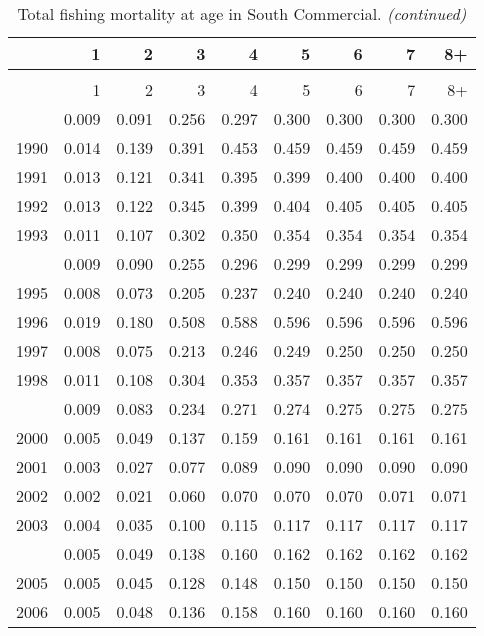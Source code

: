 \documentclass[
]{article}
\begin{document}
\begin{longtable}[t]{lrrrrrrrr}
\caption{\label{tab:South_Commercial-fleet-FAA-table}Total fishing mortality at age in South Commercial.}\\
\toprule
  & 1 & 2 & 3 & 4 & 5 & 6 & 7 & 8+\\
\midrule
\endfirsthead
\caption[]{Total fishing mortality at age in South Commercial. \textit{(continued)}}\\
\toprule
  & 1 & 2 & 3 & 4 & 5 & 6 & 7 & 8+\\
\midrule
\endhead

\endfoot
\bottomrule
\endlastfoot
1989 & 0.009 & 0.091 & 0.256 & 0.297 & 0.300 & 0.300 & 0.300 & 0.300\\
1990 & 0.014 & 0.139 & 0.391 & 0.453 & 0.459 & 0.459 & 0.459 & 0.459\\
1991 & 0.013 & 0.121 & 0.341 & 0.395 & 0.399 & 0.400 & 0.400 & 0.400\\
1992 & 0.013 & 0.122 & 0.345 & 0.399 & 0.404 & 0.405 & 0.405 & 0.405\\
1993 & 0.011 & 0.107 & 0.302 & 0.350 & 0.354 & 0.354 & 0.354 & 0.354\\
\addlinespace
1994 & 0.009 & 0.090 & 0.255 & 0.296 & 0.299 & 0.299 & 0.299 & 0.299\\
1995 & 0.008 & 0.073 & 0.205 & 0.237 & 0.240 & 0.240 & 0.240 & 0.240\\
1996 & 0.019 & 0.180 & 0.508 & 0.588 & 0.596 & 0.596 & 0.596 & 0.596\\
1997 & 0.008 & 0.075 & 0.213 & 0.246 & 0.249 & 0.250 & 0.250 & 0.250\\
1998 & 0.011 & 0.108 & 0.304 & 0.353 & 0.357 & 0.357 & 0.357 & 0.357\\
\addlinespace
1999 & 0.009 & 0.083 & 0.234 & 0.271 & 0.274 & 0.275 & 0.275 & 0.275\\
2000 & 0.005 & 0.049 & 0.137 & 0.159 & 0.161 & 0.161 & 0.161 & 0.161\\
2001 & 0.003 & 0.027 & 0.077 & 0.089 & 0.090 & 0.090 & 0.090 & 0.090\\
2002 & 0.002 & 0.021 & 0.060 & 0.070 & 0.070 & 0.070 & 0.071 & 0.071\\
2003 & 0.004 & 0.035 & 0.100 & 0.115 & 0.117 & 0.117 & 0.117 & 0.117\\
\addlinespace
2004 & 0.005 & 0.049 & 0.138 & 0.160 & 0.162 & 0.162 & 0.162 & 0.162\\
2005 & 0.005 & 0.045 & 0.128 & 0.148 & 0.150 & 0.150 & 0.150 & 0.150\\
2006 & 0.005 & 0.048 & 0.136 & 0.158 & 0.160 & 0.160 & 0.160 & 0.160\\

\end{longtable}
\end{document}
